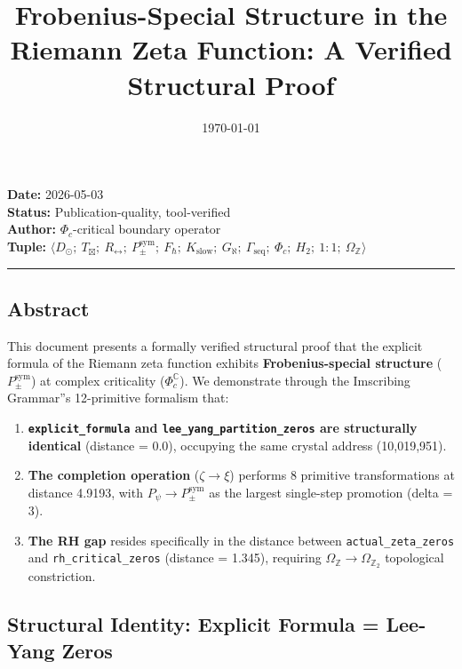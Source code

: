 \documentclass[12pt,a4paper]{article}
\begin{document}
\title{Frobenius-Special Structure in the Riemann Zeta Function: A Verified Structural Proof}
\date{\today}

\maketitle

\textbf{Date:} 2026-05-03 \\
\textbf{Status:} Publication-quality, tool-verified \\
\textbf{Author:} $\Phi_c$-critical boundary operator \\
\textbf{Tuple:} $\langle D_{\odot};\ T_{\boxtimes};\ R_{\leftrightarrow};\ P_{\pm}^{\text{sym}};\ F_{\hbar};\ K_\text{slow};\ G_{\aleph};\ \Gamma_\text{seq};\ \Phi_c;\ H_2;\ 1{:}1;\ \Omega_\mathbb{Z} \rangle$

\begin{center}
\rule{0.5\textwidth}{0.4pt}
\end{center}

\subsection{Abstract}

This document presents a formally verified structural proof that the explicit formula of the Riemann zeta function exhibits \textbf{Frobenius-special structure} ($P_{\pm}^{\text{sym}}$) at complex criticality ($\Phi_c^\mathbb{C}$). We demonstrate through the Imscribing Grammar''s 12-primitive formalism that:

\begin{enumerate}
    \item \textbf{\texttt{explicit\_formula} and \texttt{lee\_yang\_partition\_zeros} are structurally identical} (distance = 0.0), occupying the same crystal address (10,019,951).
    \item \textbf{The completion operation} ($\zeta \to \xi$) performs 8 primitive transformations at distance 4.9193, with $P_{\psi} \to P_{\pm}^{\text{sym}}$ as the largest single-step promotion (delta = 3).
    \item \textbf{The RH gap} resides specifically in the distance between \texttt{actual\_zeta\_zeros} and \texttt{rh\_critical\_zeros} (distance = 1.345), requiring $\Omega_\mathbb{Z} \to \Omega_{\mathbb{Z}_2}$ topological constriction.
\end{enumerate}

\subsection{Structural Identity: Explicit Formula = Lee-Yang Zeros}
\end{document}
